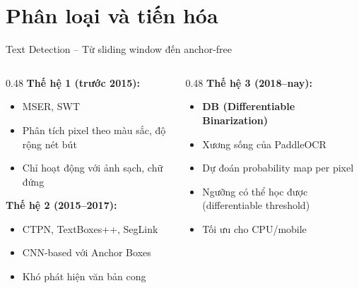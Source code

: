 \documentclass[aspectratio=169]{beamer}
\begin{document}
\section{Phân loại và tiến hóa}

\begin{frame}{Text Detection -- Từ sliding window đến anchor-free}
    \begin{columns}[T]
        \begin{column}{0.48\textwidth}
            \textbf{Thế hệ 1 (trước 2015):}
            \begin{itemize}
                \item MSER, SWT
                \item Phân tích pixel theo màu sắc, độ rộng nét bút
                \item Chỉ hoạt động với ảnh sạch, chữ đứng
            \end{itemize}
            \vspace{0.3cm}
            \textbf{Thế hệ 2 (2015--2017):}
            \begin{itemize}
                \item CTPN, TextBoxes++, SegLink
                \item CNN-based với Anchor Boxes
                \item Khó phát hiện văn bản cong
            \end{itemize}
        \end{column}
        \begin{column}{0.48\textwidth}
            \textbf{Thế hệ 3 (2018--nay):}
            \begin{itemize}
                \item \textbf{DB (Differentiable Binarization)}
                \item Xương sống của PaddleOCR
                \item Dự đoán probability map per pixel
                \item Ngưỡng có thể học được (differentiable threshold)
                \item Tối ưu cho CPU/mobile
            \end{itemize}
        \end{column}
    \end{columns}
\end{frame}
\end{document}
